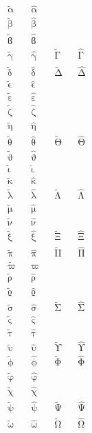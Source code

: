 \begin{align*}
  \tilde{\upalpha}    && \hat{\upalpha} \\
  \tilde{\upbeta}     && \hat{\upbeta}  \\
  \tilde{\upvarbeta}  && \hat{\upvarbeta}  \\
  \tilde{\upgamma}    && \hat{\upgamma} && \tilde{\upGamma} && \hat{\upGamma} \\
  \tilde{\updelta}    && \hat{\updelta} && \tilde{\upDelta} && \hat{\upDelta} \\
  \tilde{\upvarepsilon} &&\hat{\upvarepsilon} \\
  \tilde{\upepsilon}  && \hat{\upepsilon} \\
  \tilde{\upzeta}     && \hat{\upzeta} \\
  \tilde{\upeta}      && \hat{\upeta}  \\
  \tilde{\uptheta}    && \hat{\uptheta} && \tilde{\upTheta} && \hat{\upTheta} \\
  \tilde{\upvartheta} &&\hat{\upvartheta} \\
  \tilde{\upiota}     && \hat{\upiota} \\
  \tilde{\upkappa}    && \hat{\upkappa} \\
  \tilde{\uplambda}   &&\hat{\uplambda} &&\tilde{\upLambda} &&\hat{\upLambda} \\
  \tilde{\upmu}       &&\hat{\upmu} \\
  \tilde{\upnu}       &&\hat{\upnu} \\
  \tilde{\upxi}       &&\hat{\upxi}     &&\tilde{\upXi}     &&\hat{\upXi} \\
  \tilde{\uppi}       &&\hat{\uppi}     &&\tilde{\upPi}     &&\hat{\upPi} \\
  \tilde{\upvarpi}    && \hat{\upvarpi} \\
  \tilde{\uprho}      && \hat{\uprho} \\
  \tilde{\upvarrho}   &&\hat{\upvarrho} \\
  \tilde{\upsigma}    && \hat{\upsigma} && \tilde{\upSigma} && \hat{\upSigma} \\
  \tilde{\upvarsigma} && \hat{\upvarsigma} \\
  \tilde{\uptau}      && \hat{\uptau} \\
  \tilde{\upupsilon}  && \hat{\upupsilon} && \tilde{\upUpsilon} && \hat{\upUpsilon} \\
  \tilde{\upphi}      && \hat{\upphi}   && \tilde{\upPhi} && \hat{\upPhi} \\
  \tilde{\upvarphi}   &&\hat{\upvarphi} \\
  \tilde{\upchi}      && \hat{\upchi} \\
  \tilde{\uppsi}      && \hat{\uppsi}   && \tilde{\upPsi}   && \hat{\upPsi} \\
  \tilde{\upomega}    && \hat{\upomega} && \tilde{\upOmega} && \hat{\upOmega}
\end{align*}


